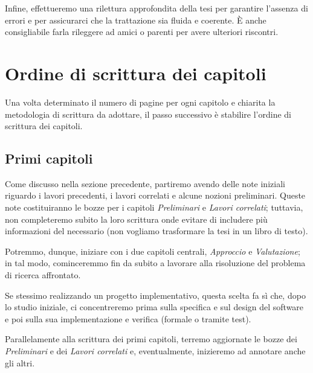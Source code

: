 Infine, effettueremo una rilettura approfondita della tesi per garantire l'assenza di errori e per assicurarci che la trattazione sia fluida e coerente. È anche consigliabile farla rileggere ad amici o parenti per avere ulteriori riscontri.

\section{Ordine di scrittura dei capitoli}

Una volta determinato il numero di pagine per ogni capitolo e chiarita la metodologia di scrittura da adottare, il passo successivo è stabilire l'ordine di scrittura dei capitoli.

\subsection{Primi capitoli}

Come discusso nella sezione precedente, partiremo avendo delle note iniziali riguardo i lavori precedenti, i lavori correlati e alcune nozioni preliminari. Queste note costituiranno le bozze per i capitoli \textit{Preliminari} e \textit{Lavori correlati}; tuttavia, non completeremo subito la loro scrittura onde evitare di includere più informazioni del necessario (non vogliamo trasformare la tesi in un libro di testo).

\medskip

Potremmo, dunque, iniziare con i due capitoli centrali, \textit{Approccio} e \textit{Valutazione}; in tal modo, cominceremmo fin da subito a lavorare alla risoluzione del problema di ricerca affrontato. 

\medskip


Se stessimo realizzando un progetto implementativo, questa scelta fa sì che, dopo lo studio iniziale, ci concentreremo prima sulla specifica e sul design del software e poi sulla sua implementazione e verifica (formale o tramite test).

\medskip

Parallelamente alla scrittura dei primi capitoli, terremo aggiornate le bozze dei \textit{Preliminari} e dei \textit{Lavori correlati} e, eventualmente, inizieremo ad annotare anche gli altri.

